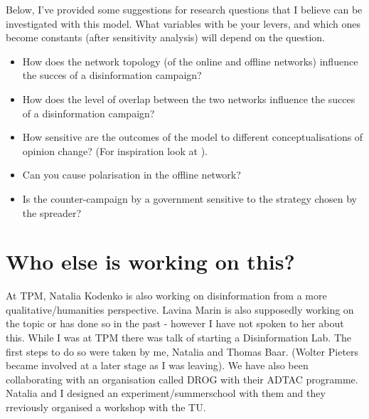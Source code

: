 \documentclass[10pt,a4paper]{article}
\begin{document}
Below, I've provided some suggestions for research questions that I believe can be investigated with this model. What variables with be your levers, and which ones become constants (after sensitivity analysis) will depend on the question.


\begin{itemize}
	\item How does the network topology (of the online and offline networks) influence the succes of a disinformation campaign?
	\item How does the level of overlap between the two networks influence the succes of a disinformation campaign?
	\item How sensitive are the outcomes of the model to different conceptualisations of opinion change? (For inspiration look at \cite{Flache2017}).
	\item Can you cause polarisation in the offline network?
	\item Is the counter-campaign by a government sensitive to the strategy chosen by the spreader?
\end{itemize}

\section{Who else is working on this?}
At TPM, Natalia Kodenko is also working on disinformation from a more qualitative/humanities perspective. Lavina Marin is also supposedly working on the topic or has done so in the past - however I have not spoken to her about this. 
While I was at TPM there was talk of starting a Disinformation Lab. The first steps to do so were taken by me, Natalia and Thomas Baar. (Wolter Pieters became involved at a later stage as I was leaving). We have also been collaborating with an organisation called DROG with their ADTAC programme. Natalia and I designed an experiment/summerschool with them and they rreviously organised a workshop with the TU.



	
\end{document}
